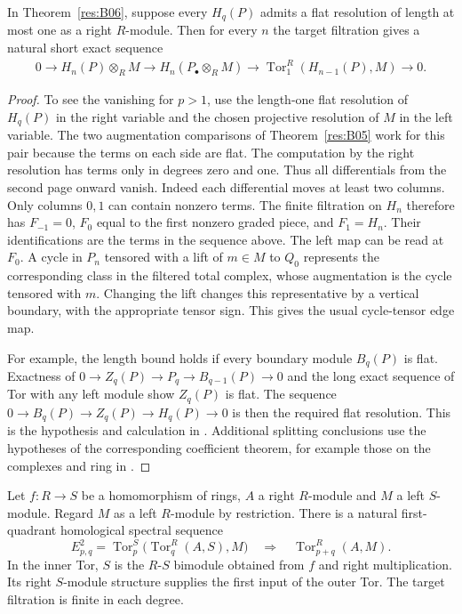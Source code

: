 \begin{corollary}
\label{res:B08}
In Theorem~\ref{res:B06}, suppose every \(H_q(P)\) admits a flat
resolution of length at most one as a right \(R\)-module. Then for
every \(n\) the target filtration gives a natural short exact sequence
\[
\begin{split}
 0 \longrightarrow H_n(P)\otimes_R M
    \longrightarrow H_n(P_\bullet\otimes_R M)
    \longrightarrow \operatorname{Tor}_1^R(H_{n-1}(P),M)
    \longrightarrow 0 .
\end{split}
\]
\end{corollary}

\begin{proof}
To see the vanishing for \(p>1\), use the length-one flat resolution
of \(H_q(P)\) in the right variable and the chosen projective resolution
of \(M\) in the left variable. The two augmentation comparisons of
Theorem~\ref{res:B05} work for this pair because the terms on each
side are flat. The computation by the right resolution has terms
only in degrees zero and one. Thus all differentials from the second
page onward vanish.
Indeed each differential moves at least two columns.
Only columns \(0,1\) can contain nonzero terms. The finite filtration
on \(H_n\) therefore has \(F_{-1}=0\), \(F_0\) equal to the first
nonzero graded piece, and \(F_1=H_n\). Their identifications are the
terms in the sequence above. The left map can be read at \(F_0\).
A cycle in \(P_n\) tensored with a lift of \(m\in M\) to \(Q_0\)
represents the corresponding class in the filtered total complex,
whose augmentation is the cycle tensored with \(m\). Changing the
lift changes this representative by a vertical boundary, with the
appropriate tensor sign. This gives the usual cycle-tensor edge map.

For example, the length bound holds if every boundary module
\(B_q(P)\) is flat. Exactness of
\(0\to Z_q(P)\to P_q\to B_{q-1}(P)\to0\) and the long exact sequence
of Tor with any left module show \(Z_q(P)\) is flat.
The sequence \(0\to B_q(P)\to Z_q(P)\to H_q(P)\to0\) is then the
required flat resolution. This is the hypothesis and calculation in
\cite[Formula 5.6.5]{weibel}. Additional splitting conclusions use
the hypotheses of the corresponding coefficient theorem, for
example those on the complexes and ring in
\cite[Chapter 11]{p103}.
\end{proof}

\begin{theorem}
\label{res:B07}
Let \(f\colon R\to S\) be a homomorphism of rings, \(A\) a right
\(R\)-module and \(M\) a left \(S\)-module. Regard \(M\) as a left
\(R\)-module by restriction. There is a natural first-quadrant
homological spectral sequence
\[
 E^2_{p,q}=\operatorname{Tor}^S_p\bigl(\operatorname{Tor}^R_q(A,S),M\bigr)
       \quad\Longrightarrow\quad \operatorname{Tor}^R_{p+q}(A,M).
\]
In the inner Tor, \(S\) is the \(R\)-\(S\) bimodule obtained from \(f\)
and right multiplication. Its right \(S\)-module structure supplies
the first input of the outer Tor. The target filtration is finite
in each degree.
\end{theorem}

